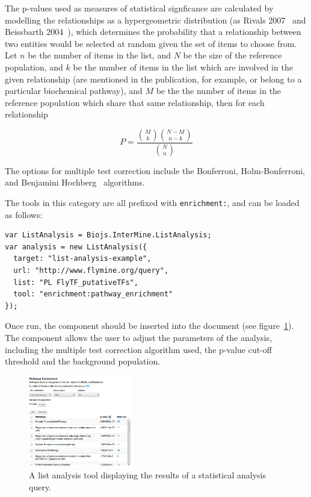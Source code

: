 \documentclass[10pt,a4paper,twocolumn]{article}
\begin{document}
The p-values used as measures of statistical signficance are calculated by modelling the
relationships as a hypergeometric distribution (as Rivals 2007~\cite{rivals} and Beissbarth 2004~\cite{beissbarth}), which determines the probability that a relationship between two
entities would be selected at random given the set of items to choose from. Let $n$ be the
number of items in the list, and $N$ be the size
of the reference population, and $k$ be the number of items in the list
which are involved in the given relationship (are mentioned in the
publication, for example, or belong to a particular biochemical
pathway), and $M$ be the the number of items in the reference
population which share that same relationship, then for each relationship

$$P = \frac{{M \choose k} {N-M \choose n-k}}{{N \choose n}}$$
      
The options for multiple test correction include the Bonferroni, Holm-Bonferroni, and Benjamini Hochberg~\cite{benjamini} algorithms.

The tools in this category are all prefixed with \texttt{enrichment:}, and can be loaded as
follows:

\begin{lstlisting}[caption={Loading an enrichment list analysis tool.},label={code:load-enrichment}]
var ListAnalysis = Biojs.InterMine.ListAnalysis;
var analysis = new ListAnalysis({
  target: "list-analysis-example",
  url: "http://www.flymine.org/query",
  list: "PL FlyTF_putativeTFs",
  tool: "enrichment:pathway_enrichment"
});
\end{lstlisting}

Once run, the component should be inserted into the document (see
figure~\ref{fig:pathways}). The
component allows the user to adjust the parameters of the analysis, including the multiple
test correction algorithm used, the p-value cut-off threshold and the background population.

\begin{figure}[htbp]
\centering
\includegraphics[width=0.4\textwidth]{pathway-enrichment.png}
\caption{\label{fig:pathways}A list analysis tool displaying the results of a
statistical analysis query.}
\end{figure}
\end{document}
